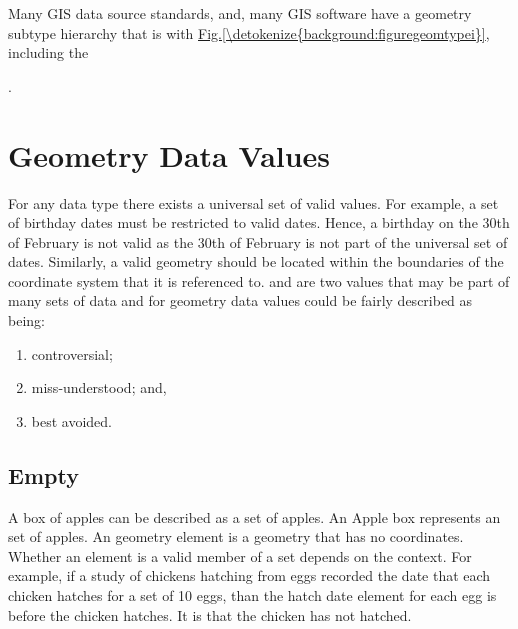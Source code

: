 \documentclass[a4paper,11pt,english]{sphinxmanual}
\begin{document}
Many GIS data source standards, and, many GIS software have a geometry subtype hierarchy that is  with \hyperref[\detokenize{background:figuregeomtypei}]{Fig.\@ \ref{\detokenize{background:figuregeomtypei}}}, including the %
\begin{footnote}[2]\sphinxAtStartFootnote
{}
%
\end{footnote} .


\section{Geometry Data Values}
\label{\detokenize{background:geometry-data-values}}
For any data type there exists a universal set of valid values.  For example, a set of birthday dates must be restricted to valid dates.  Hence, a birthday on the 30th of February is not valid as the 30th of February is not part of the universal set of dates.  Similarly, a valid geometry should be located within the boundaries of the coordinate system that it is referenced to.   and  are two values that may be part of many sets of data and for geometry data values could be fairly described as being:
\begin{enumerate}
\def\theenumi{\arabic{enumi}}
\def\labelenumi{\theenumi .}
\makeatletter\def\p@enumii{\p@enumi \theenumi .}\makeatother
\item {} 
controversial;

\item {} 
miss-understood; and,

\item {} 
best avoided.

\end{enumerate}


\subsection{Empty}
\label{\detokenize{background:empty}}\label{\detokenize{background:emptyanchor}}
A box of apples can be described as a set of apples.  An  Apple box represents an  set of apples.  An  geometry element is a geometry that has no coordinates.  Whether an  element is a valid member of a set depends on the context.  For example, if a study of chickens hatching from eggs recorded the date that each chicken hatches for a set of 10 eggs, than the hatch date element for each egg is  before the chicken hatches.  It is  that the chicken has not hatched.
\end{document}

